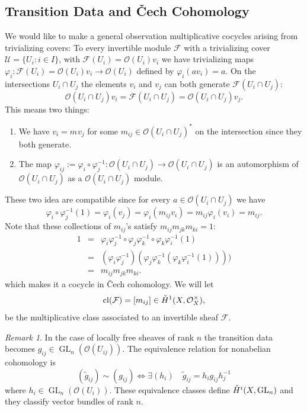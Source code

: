 \documentclass[12pt]{article}
\numberwithin{equation}{section}
\theoremstyle{definition}
\theoremstyle{remark}
\newtheorem{remark}[theorem]{Remark}
\newcommand{\Ocal}{\mathcal{O}}
\newcommand{\Fcal}{\mathcal{F}}
\newcommand{\cl}{\operatorname{cl}}
\newcommand{\Hv}{\Check{H}}
\newcommand{\GL}{\operatorname{GL}}
\begin{document}
\subsection{Transition Data and \v{C}ech Cohomology}
We would like to make a general observation multiplicative cocycles arising from trivializing covers: To every invertible module $\mathcal F$ with a trivializing cover $\mathcal U = \lbrace U_i:i\in I\rbrace$, with $\mathcal F(U_i) = \mathcal O(U_i) v_i $ we have trivializing maps $\varphi_i: \mathcal F(U_i) = \mathcal O(U_i) v_i \to \mathcal O(U_i)$ defined by $\varphi_i(av_i) = a.$
On the intersections $U_i\cap U_j$ the elements $v_i$ and $v_j$ can both generate $\mathcal F(U_i\cap U_j)$:
$$ \mathcal O(U_i\cap U_j) v_i = \mathcal F(U_i\cap U_j) = \mathcal O(U_i\cap U_j) v_j . $$
This means two things: 
\begin{enumerate}
	\item We have $v_i = m_{} v_j$ for some $m_{ij}\in \mathcal O(U_i\cap U_j)^*$ on the intersection since they both generate. 
	\item The map $\varphi_{ij}:=\varphi_i \circ \varphi_j^{-1}:\mathcal O(U_i\cap U_j)\to \mathcal O(U_i\cap U_j)$ is an automorphism of $\mathcal O(U_i\cap U_j)$ as a $\mathcal O(U_i\cap U_j)$ module. 
\end{enumerate}
These two idea are compatible since for every $a\in \mathcal O(U_i\cap U_j)$ we have
\begin{equation}\label{eqn:invertible_shead_to_multiplicative_cocycle}
\varphi_i\circ\varphi_j^{-1}(1) = \varphi_i(v_j) = \varphi_i(m_{ij} v_i) = m_{ij} \varphi_i(v_i) = m_{ij}.
\end{equation}
Note that these collections of $m_{ij}$'s satisfy $m_{ij}m_{jk}m_{ki}=1$:
\begin{eqnarray*}
	1 &=& \varphi_i\varphi_j^{-1}\circ \varphi_j\varphi_k^{-1}\circ \varphi_k\varphi_i^{-1}(1)\\
	&=& (\varphi_i\varphi_j^{-1})( \varphi_j\varphi_k^{-1}( \varphi_k\varphi_i^{-1}(1))))\\
	&=& m_{ij}m_{jk}m_{ki}.
\end{eqnarray*}
which makes it a cocycle in \v{C}ech cohomology.
We will let 
$$ \cl(\Fcal) = [m_{ij}] \in \Check{H}^1(X,\Ocal_X^{\times}),$$
be the multiplicative class associated to an invertible sheaf $\Fcal$.

\begin{remark}
	In the case of locally free sheaves of rank $n$ the transition data becomes $g_{ij} \in \GL_n(\Ocal(U_{ij}))$.
	The equivalence relation for nonabelian cohomology is 
	 $$ (\widetilde{g}_{ij}) \sim (g_{ij}) \iff \exists (h_i) \quad \widetilde{g}_{ij} = h_i g_{ij} h_j^{-1} $$
	where $h_i \in \GL_n(\Ocal(U_i))$. These equivalence classes define $\Hv^i(X,\GL_n)$ and they classify vector bundles of rank $n$.
\end{remark}
\end{document}
